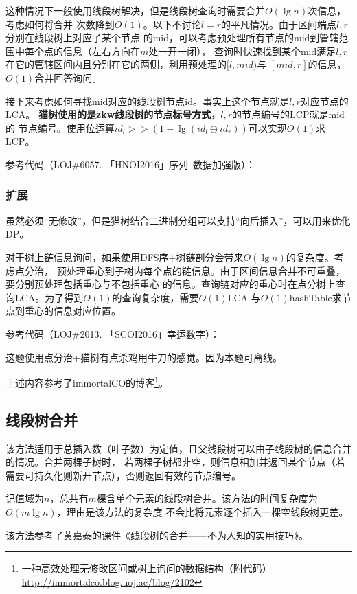 这种情况下一般使用线段树解决，但是线段树查询时需要合并$O(\lg n)$次信息，考虑如何将合并
次数降到$O(1)$。以下不讨论$l=r$的平凡情况。由于区间端点$l,r$分别在线段树上对应了某个节点
的mid，可以考虑预处理所有节点的mid到管辖范围中每个点的信息（左右方向在$m$处一开一闭），
查询时快速找到某个mid满足$l,r$在它的管辖区间内且分别在它的两侧，利用预处理的$[l,mid)$与
$[mid,r]$的信息，$O(1)$合并回答询问。

接下来考虑如何寻找mid对应的线段树节点id。事实上这个节点就是$l,r$对应节点的LCA。
{\bfseries 猫树使用的是zkw线段树的节点标号方式，}$l,r$的节点编号的LCP就是mid的
节点编号。使用位运算$id_l>>(1+\lg(id_l\oplus id_r))$可以实现$O(1)$求LCP。

参考代码（LOJ\#6057. 「HNOI2016」序列~数据加强版）：


\subsubsection{扩展}
虽然必须``无修改''，但是猫树结合二进制分组可以支持``向后插入''，可以用来优化DP。

对于树上链信息询问，如果使用DFS序+树链剖分会带来$O(\lg n)$的复杂度。考虑点分治，
预处理重心到子树内每个点的链信息。由于区间信息合并不可重叠，要分别预处理包括重心与不包括重心
的信息。查询链对应的重心时在点分树上查询LCA。为了得到$O(1)$的查询复杂度，需要$O(1)$LCA
与$O(1)$hashTable求节点到重心的信息对应位置。

参考代码（LOJ\#2013. 「SCOI2016」幸运数字）：

这题使用点分治+猫树有点杀鸡用牛刀的感觉。因为本题可离线。



上述内容参考了immortalCO的博客\footnote{
    一种高效处理无修改区间或树上询问的数据结构（附代码）
    \url{http://immortalco.blog.uoj.ac/blog/2102}
}。
\subsection{线段树合并}
该方法适用于总插入数（叶子数）为定值，且父线段树可以由子线段树的信息合并的情况。合并两棵子树时，
若两棵子树都非空，则信息相加并返回某个节点（若需要可持久化则新开节点），否则返回有效的节点编号。

记值域为$n$，总共有$m$棵含单个元素的线段树合并。该方法的时间复杂度为$O(m\lg n)$，理由是该方法的复杂度
不会比将元素逐个插入一棵空线段树更差。

该方法参考了黄嘉泰的课件《线段树的合并——不为人知的实用技巧》。

